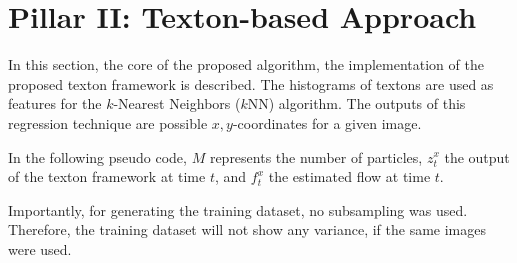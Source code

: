\section{Pillar II: Texton-based Approach}
\label{sec:textons}

In this section, the core of the proposed algorithm, the
implementation of the proposed texton framework is described.  The
histograms of textons are used as features for the $k$-Nearest
Neighbors ($k$NN) algorithm. The outputs of this regression technique
are possible $x,y$-coordinates for a given image.

In the following pseudo code, $M$ represents the number of particles,
$z_t^x$ the output of the texton framework at time $t$, and $f_t^x$
the estimated flow at time $t$.


Importantly, for generating the training dataset, no subsampling was
used. Therefore, the training dataset will not show any variance, if
the same images were used.
